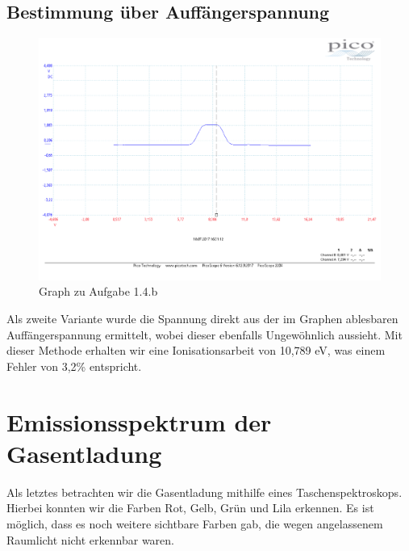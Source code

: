 \subsection{Bestimmung über Auffängerspannung}
\begin{figure}
	\includegraphics[width=\textwidth]{../Daten/Aufgabe1/Frank_Hertz_1_4_b_2.pdf}
	\caption{Graph zu Aufgabe 1.4.b}
\end{figure}
Als zweite Variante wurde die Spannung direkt aus der im Graphen ablesbaren Auffängerspannung ermittelt, wobei dieser ebenfalls Ungewöhnlich aussieht. Mit dieser Methode erhalten wir eine Ionisationsarbeit von 10,789 eV, was einem Fehler von 3,2\% entspricht.
\section{Emissionsspektrum der Gasentladung}
Als letztes betrachten wir die Gasentladung mithilfe eines Taschenspektroskops. Hierbei konnten wir die Farben Rot, Gelb, Grün und Lila erkennen. Es ist möglich, dass es noch weitere sichtbare Farben gab, die wegen angelassenem Raumlicht nicht erkennbar waren.